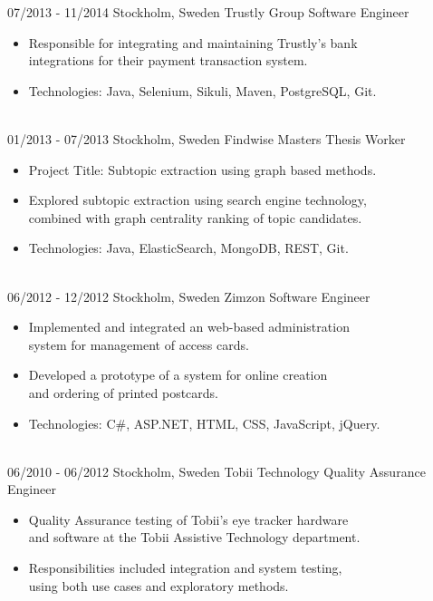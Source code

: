 \documentclass{markusos-cv}
\begin{document}
\begin{entrylist}
\entry
{07/2013 - 11/2014}
{Stockholm, Sweden}
{Trustly Group}
{Software Engineer} 
{
\begin{itemize}
\item  Responsible for integrating and maintaining Trustly's bank\\
 integrations for their payment transaction system.
\item  Technologies: Java, Selenium, Sikuli, Maven, PostgreSQL, Git.
\end{itemize}
}
\\%
\entry
{01/2013 - 07/2013}
{Stockholm, Sweden}
{Findwise}
{Masters Thesis Worker} 
{
\begin{itemize}
\item Project Title: Subtopic extraction using graph based methods.
\item Explored subtopic extraction using search engine technology,\\ combined with graph centrality ranking of topic candidates.
\item Technologies: Java, ElasticSearch, MongoDB, REST, Git.
\end{itemize} 
}
\\%
\entry
{06/2012 - 12/2012}
{Stockholm, Sweden}
{Zimzon}
{Software Engineer} 
{
\begin{itemize}
\item Implemented and integrated an web-based administration\\ system for management of access cards.
\item Developed a prototype of a system for online creation\\ and ordering of printed postcards.
\item Technologies: C\#, ASP.NET, HTML, CSS, JavaScript, jQuery.
\end{itemize} 
}
\\%
\entry
{06/2010 - 06/2012}
{Stockholm, Sweden}
{Tobii Technology}
{Quality Assurance Engineer} 
{
\begin{itemize}
\item Quality Assurance testing of Tobii's eye tracker hardware\\ and software at the Tobii Assistive Technology department.
\item Responsibilities included integration and system testing,\\ using both use cases and exploratory methods.
\end{itemize} 
}
\end{entrylist}
\end{document}
